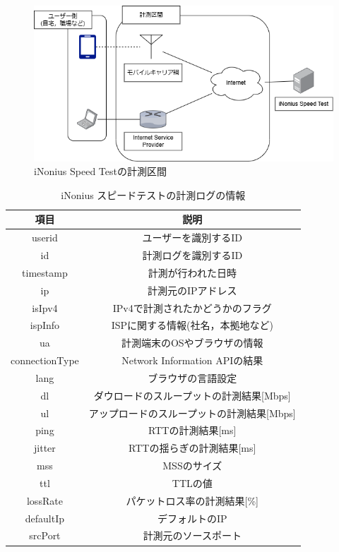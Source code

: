 \begin{figure}[htbp]
    \centering
    \includegraphics[width=1.0\textwidth]{fig/Measurment.png}
    \caption{iNonius Speed Testの計測区間}
    \label{fig:Measurment}
\end{figure}
\FloatBarrier
\begin{table}[htbp]
    \caption{iNonius スピードテストの計測ログの情報}
    \label{tab:loginfo}
    \begin{center}
        \begin{tabular}{c|c} \hline
            項目 & 説明 \\ \hline \hline
            userid & ユーザーを識別するID \\
            id & 計測ログを識別するID \\
            timestamp & 計測が行われた日時 \\
            ip & 計測元のIPアドレス \\
            isIpv4 & IPv4で計測されたかどうかのフラグ \\
            ispInfo & ISPに関する情報(社名，本拠地など) \\
            ua & 計測端末のOSやブラウザの情報 \\
            connectionType & Network Information APIの結果 \\
            lang & ブラウザの言語設定 \\
            dl & ダウロードのスループットの計測結果[Mbps] \\
            ul & アップロードのスループットの計測結果[Mbps] \\
            ping & RTTの計測結果[ms] \\
            jitter & RTTの揺らぎの計測結果[ms] \\
            mss & MSSのサイズ \\
            ttl & TTLの値 \\
            lossRate & パケットロス率の計測結果[\%] \\
            defaultIp & デフォルトのIP \\
            srcPort & 計測元のソースポート \\ \hline
        \end{tabular}
    \end{center}
\end{table}
\FloatBarrier

